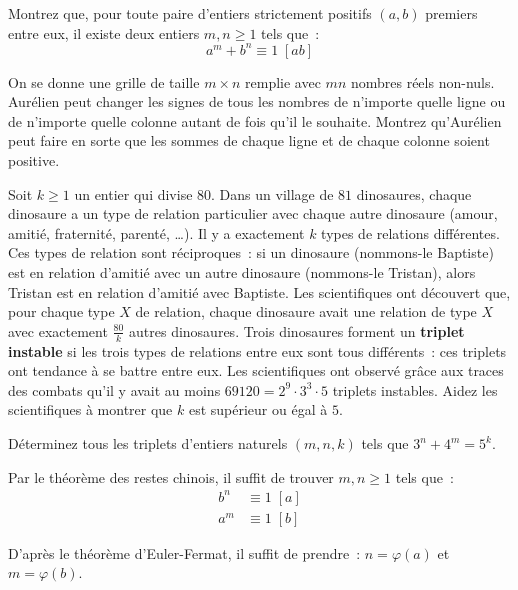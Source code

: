 
\begin{exo}
Montrez que, pour toute paire d'entiers strictement positifs $(a, b)$ premiers entre eux, il existe deux entiers $m, n \ge 1$ tels que~:
$$a^m + b^n \equiv 1 \; [ab]$$
\end{exo}


\begin{exo}
On se donne une grille de taille $m\times n$ remplie avec $mn$ nombres réels non-nuls. Aurélien peut changer les signes de tous les nombres de n'importe quelle ligne ou de n'importe quelle colonne autant de fois qu'il le souhaite. Montrez qu'Aurélien peut faire en sorte que les sommes de chaque ligne et de chaque colonne soient positive.
\end{exo}


\begin{exo}
Soit $k \ge 1$ un entier qui divise $80$.
Dans un village de $81$ dinosaures, chaque dinosaure a un type de relation particulier avec chaque autre dinosaure (amour, amitié, fraternité, parenté, \dots). Il y a exactement $k$ types de relations différentes.
Ces types de relation sont réciproques~: si un dinosaure (nommons-le Baptiste) est en relation d'amitié avec un autre dinosaure (nommons-le Tristan), alors Tristan est en relation d'amitié avec Baptiste. Les scientifiques ont découvert que, pour chaque type $X$ de relation, chaque dinosaure avait une relation de type $X$ avec exactement $\frac{80}{k}$ autres dinosaures.
Trois dinosaures forment un \textbf{triplet instable} si les trois types de relations entre eux sont tous différents~: ces triplets ont tendance à se battre entre eux.
Les scientifiques ont observé grâce aux traces des combats qu'il y avait au moins $69120 = 2^9\cdot 3^3\cdot 5$ triplets instables. Aidez les scientifiques à montrer que $k$ est supérieur ou égal à $5$.
\end{exo}


\begin{exo}
Déterminez tous les triplets d'entiers naturels $(m, n, k)$ tels que $3^n + 4^m = 5^k$.
\end{exo}




\begin{sol}
Par le théorème des restes chinois, il suffit de trouver $m, n \ge 1$ tels que~:
\begin{align*}
    b^n &\equiv 1 \; [a] \\
    a^m &\equiv 1 \; [b]
\end{align*}

D'après le théorème d'Euler-Fermat, il suffit de prendre~: $n = \varphi(a)$ et $m = \varphi(b)$.
\end{sol}


